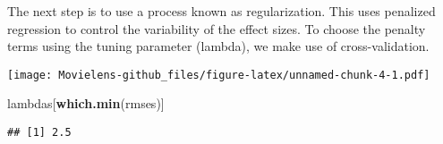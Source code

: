 \documentclass[]{article}
\newenvironment{Shaded}{\begin{snugshade}}{\end{snugshade}}
\newcommand{\ControlFlowTok}[1]{\textcolor[rgb]{0.13,0.29,0.53}{\textbf{#1}}}
\newcommand{\DataTypeTok}[1]{\textcolor[rgb]{0.13,0.29,0.53}{#1}}
\newcommand{\DecValTok}[1]{\textcolor[rgb]{0.00,0.00,0.81}{#1}}
\newcommand{\FloatTok}[1]{\textcolor[rgb]{0.00,0.00,0.81}{#1}}
\newcommand{\KeywordTok}[1]{\textcolor[rgb]{0.13,0.29,0.53}{\textbf{#1}}}
\newcommand{\NormalTok}[1]{#1}
\newcommand{\OperatorTok}[1]{\textcolor[rgb]{0.81,0.36,0.00}{\textbf{#1}}}
\newcommand{\StringTok}[1]{\textcolor[rgb]{0.31,0.60,0.02}{#1}}
\begin{document}
The next step is to use a process known as regularization. This uses
penalized regression to control the variability of the effect sizes. To
choose the penalty terms using the tuning parameter (lambda), we make
use of cross-validation.

\begin{Shaded}
\end{Shaded}

\texttt{[image: Movielens-github\_files/figure-latex/unnamed-chunk-4-1.pdf]}

\begin{Shaded}
\begin{Highlighting}[]
\NormalTok{lambdas[}\KeywordTok{which.min}\NormalTok{(rmses)]}
\end{Highlighting}
\end{Shaded}

\begin{verbatim}
## [1] 2.5
\end{verbatim}
\end{document}
